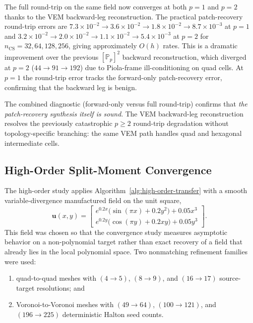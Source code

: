 \documentclass[11pt]{article}
\begin{document}
The full round-trip on the same field now converges at both \(p=1\) and \(p=2\)
thanks to the VEM backward-leg reconstruction.  The practical patch-recovery
round-trip errors are \(7.3\times10^{-2} \to 3.6\times10^{-2} \to
1.8\times10^{-2} \to 8.7\times10^{-3}\) at \(p=1\) and \(3.2\times10^{-2}
\to 2.0\times10^{-2} \to 1.1\times10^{-2} \to 5.4\times10^{-3}\) at
\(p=2\) for \(n_{\mathrm{CS}}=32,64,128,256\), giving approximately \(O(h)\)
rates.  This is a dramatic improvement over the previous
\([\mathbb{P}_p]^2\) backward reconstruction, which diverged at \(p=2\)
(\(44\to91\to192\)) due to Piola-frame ill-conditioning on quad cells.
At \(p=1\) the round-trip error tracks the forward-only patch-recovery error,
confirming that the backward leg is benign.

The combined diagnostic (forward-only versus full round-trip) confirms that
\emph{the patch-recovery synthesis itself is sound}.  The VEM backward-leg
reconstruction resolves the previously catastrophic \(p\ge2\) round-trip
degradation without topology-specific branching: the same VEM path handles
quad and hexagonal intermediate cells.

\subsection{High-Order Split-Moment Convergence}

The high-order study applies Algorithm~\ref{alg:high-order-transfer} with a
smooth variable-divergence manufactured field on the unit square,
\begin{equation}
  \mathbf{u}(x,y)=
  \begin{bmatrix}
    e^{0.2x}\bigl(\sin(\pi x)+0.2y^2\bigr)+0.05x^3 \\
    e^{0.2y}\bigl(\cos(\pi y)+0.2xy\bigr)+0.05y^3
  \end{bmatrix}.
  \label{eq:high-order-test-field}
\end{equation}
This field was chosen so that the convergence study measures asymptotic
behavior on a non-polynomial target rather than exact recovery of a field that
already lies in the local polynomial space.  Two nonmatching refinement
families were used:
\begin{enumerate}
  \item quad-to-quad meshes with \((4\to5)\), \((8\to9)\), and \((16\to17)\)
        source-target resolutions; and
  \item Voronoi-to-Voronoi meshes with
        \((49\to64)\), \((100\to121)\), and \((196\to225)\) deterministic
        Halton seed counts.
\end{enumerate}
\end{document}
